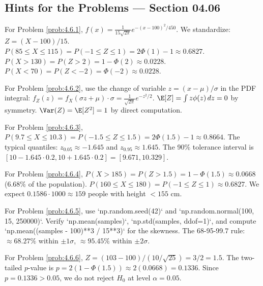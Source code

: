 \subsection*{Hints for the Problems --- Section 04.06}

\begin{sugerencia}
	\label{sug:4.6.1}
	For Problem \ref{prob:4.6.1}, $f(x) = \frac{1}{15\sqrt{2\pi}} e^{-(x-100)^{2}/450}$. We standardize: $Z = (X-100)/15$. $P(85 \le X \le 115) = P(-1 \le Z \le 1) = 2\Phi(1) - 1 \approx 0.6827$. $P(X > 130) = P(Z > 2) = 1 - \Phi(2) \approx 0.0228$. $P(X < 70) = P(Z < -2) = \Phi(-2) \approx 0.0228$.
\end{sugerencia}

\begin{sugerencia}
	\label{sug:4.6.2}
	For Problem \ref{prob:4.6.2}, use the change of variable $z = (x - \mu)/\sigma$ in the PDF integral: $f_{Z}(z) = f_{X}(\sigma z + \mu) \cdot \sigma = \frac{1}{\sqrt{2\pi}} e^{-z^{2}/2}$. $\E[Z] = \int z \phi(z)\,dz = 0$ by symmetry. $\Var(Z) = \E[Z^{2}] = 1$ by direct computation.
\end{sugerencia}

\begin{sugerencia}
	\label{sug:4.6.3}
	For Problem \ref{prob:4.6.3}, $P(9.7 \le X \le 10.3) = P(-1.5 \le Z \le 1.5) = 2\Phi(1.5) - 1 \approx 0.8664$. The typical quantiles: $z_{0.05} \approx -1.645$ and $z_{0.95} \approx 1.645$. The 90\% tolerance interval is $[10 - 1.645 \cdot 0.2, 10 + 1.645 \cdot 0.2] = [9.671, 10.329]$.
\end{sugerencia}

\begin{sugerencia}
	\label{sug:4.6.4}
	For Problem \ref{prob:4.6.4}, $P(X > 185) = P(Z > 1.5) = 1 - \Phi(1.5) \approx 0.0668$ (6.68\% of the population). $P(160 \le X \le 180) = P(-1 \le Z \le 1) \approx 0.6827$. We expect $0.1586 \cdot 1000 \approx 159$ people with height $< 155$ cm.
\end{sugerencia}

\begin{sugerencia}
	\label{sug:4.6.5}
	For Problem \ref{prob:4.6.5}, use `np.random.seed(42)` and `np.random.normal(100, 15, 250000)`. Verify `np.mean(samples)`, `np.std(samples, ddof=1)`, and compute `np.mean((samples - 100)**3 / 15**3)` for the skewness. The 68-95-99.7 rule: $\approx 68.27\%$ within $\pm 1\sigma$, $\approx 95.45\%$ within $\pm 2\sigma$.
\end{sugerencia}

\begin{sugerencia}
	\label{sug:4.6.6}
	For Problem \ref{prob:4.6.6}, $Z = (103 - 100)/(10/\sqrt{25}) = 3/2 = 1.5$. The two-tailed $p$-value is $p = 2(1 - \Phi(1.5)) \approx 2(0.0668) = 0.1336$. Since $p = 0.1336 > 0.05$, we do not reject $H_{0}$ at level $\alpha = 0.05$.
\end{sugerencia}

